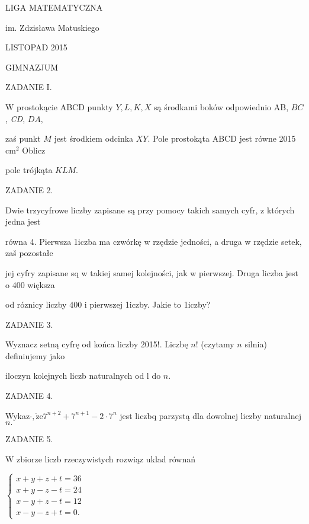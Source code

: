 \documentclass[a4paper,12pt]{article}
\begin{document}
LIGA MATEMATYCZNA

im. Zdzisława Matuskiego

LISTOPAD 2015

GIMNAZJUM

ZADANIE I.

$\mathrm{W}$ prostokącie ABCD punkty $Y, L, K, X$ są środkami boków odpowiednio AB, $BC$, {\it CD}, $DA,$

zaś punkt $M$ jest środkiem odcinka $XY$. Pole prostokąta ABCD jest równe 2015 $\mathrm{c}\mathrm{m}^{2}$ Oblicz

pole trójkąta $KLM.$

ZADANIE 2.

Dwie trzycyfrowe liczby zapisane są przy pomocy takich samych cyfr, z których jedna jest

równa 4. Pierwsza 1iczba ma czwórkę w rzędzie jedności, a druga w rzędzie setek, zaš pozostałe

jej cyfry zapisane sq w takiej samej kolejności, jak w pierwszej. Druga liczba jest o 400 większa

od róznicy liczby 400 i pierwszej 1iczby. Jakie to 1iczby?

ZADANIE 3.

Wyznacz setną cyfrę od końca liczby 2015!. Liczbę $n!$ (czytamy $n$ silnia) definiujemy jako

iloczyn kolejnych liczb naturalnych od l do $n.$

ZADANIE 4.

Wykaz$\cdot, \dot{\mathrm{z}}\mathrm{e}7^{n+2}+7^{n+1}-2\cdot 7^{n}$ jest liczbq parzystą dla dowolnej liczby naturalnej $n.$

ZADANIE 5.

$\mathrm{W}$ zbiorze liczb rzeczywistych rozwiąz uklad równań

$\left\{\begin{array}{l}
x+y+z+t=36\\
x+y-z-t=24\\
x-y+z-t=12\\
x-y-z+t=0.
\end{array}\right.$
\end{document}
